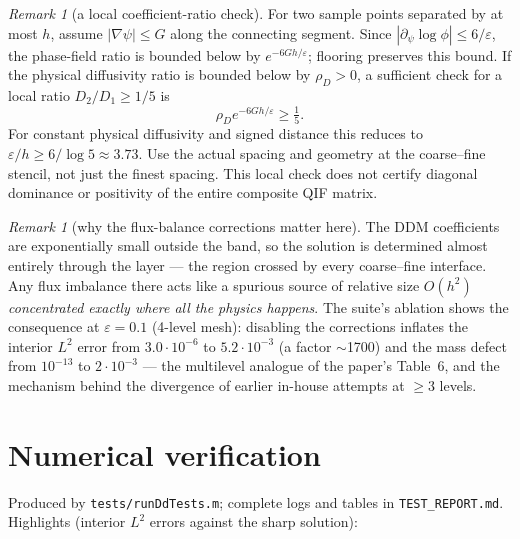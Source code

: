 \documentclass[11pt]{article}
\theoremstyle{remark}
\newtheorem{remark}[theorem]{Remark}
\newcommand{\eps}{\varepsilon}
\begin{document}
\begin{remark}[a local coefficient-ratio check]
For two sample points separated by at most $h$, assume
$|\nabla\psi|\le G$ along the connecting segment. Since
$|\partial_\psi\log\phi|\le6/\eps$, the phase-field ratio is bounded
below by $e^{-6Gh/\eps}$; flooring preserves this bound. If the physical
diffusivity ratio is bounded below by $\rho_D>0$, a sufficient check
for a local ratio $D_2/D_1\ge1/5$ is
\[
  \rho_D e^{-6Gh/\eps}\ge\tfrac15.
\]
For constant physical diffusivity and signed distance this reduces to
$\eps/h\ge6/\log5\approx3.73$. Use the actual spacing and geometry at
the coarse--fine stencil, not just the finest spacing. This local check
does not certify diagonal dominance or positivity of the entire
composite QIF matrix.
\end{remark}

\begin{remark}[why the flux-balance corrections matter here]
The DDM coefficients are exponentially small outside the band, so the
solution is determined almost entirely through the layer --- the region
crossed by every coarse--fine interface.  Any flux imbalance there acts
like a spurious source of relative size $O(h^2)$ \emph{concentrated
exactly where all the physics happens}.  The suite's ablation shows the
consequence at $\eps=0.1$ (4-level mesh): disabling the corrections
inflates the interior $L^2$ error from $3.0\cdot10^{-6}$ to
$5.2\cdot10^{-3}$ (a factor $\sim$1700) and the mass defect from
$10^{-13}$ to $2\cdot10^{-3}$ --- the multilevel analogue of the
paper's Table~6, and the mechanism behind the divergence of earlier
in-house attempts at $\ge3$ levels.
\end{remark}

\section{Numerical verification}\label{sec:num}

Produced by \texttt{tests/runDdTests.m}; complete logs and tables in
\texttt{TEST\_REPORT.md}.  Highlights (interior $L^2$ errors against the
sharp solution):
\end{document}
